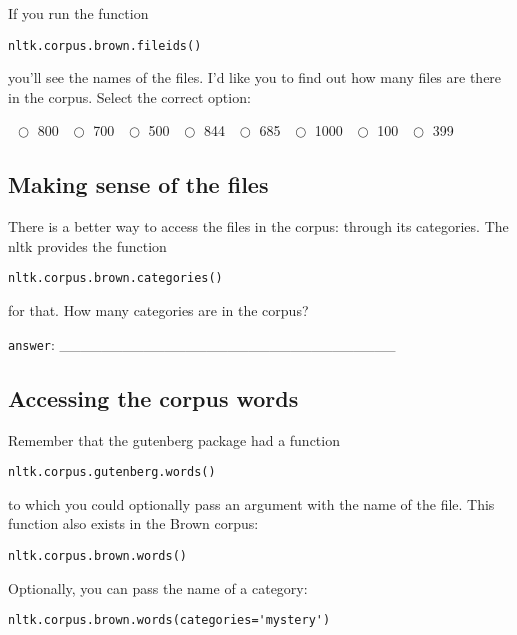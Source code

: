 \documentclass[a4paper,11pt]{scrartcl}
\begin{document}
If you run the function

\begin{verbatim}
nltk.corpus.brown.fileids()
\end{verbatim}

you'll see the names of the files. I'd like you to find out how many files
are there in the corpus. Select the correct option:

$~~\bigcirc$ 800
$~~\bigcirc$ 700
$~~\bigcirc$ 500
$~~\bigcirc$ 844
$~~\bigcirc$ 685
$~~\bigcirc$ 1000
$~~\bigcirc$ 100
$~~\bigcirc$ 399


\subsection{Making sense of the files}

There is a better way to access the files in the corpus: through its
categories. The nltk provides the function

\begin{verbatim}
nltk.corpus.brown.categories()
\end{verbatim}

for that. How many categories are in the corpus?

\verb|answer|: \_\_\_\_\_\_\_\_\_\_\_\_\_\_\_\_\_\_\_\_\_\_\_\_\_\_\_\_\_\_\_\_


\subsection{Accessing the corpus words}

Remember that the gutenberg package had a function

\begin{verbatim}
nltk.corpus.gutenberg.words()
\end{verbatim}
to which you could optionally pass an argument with the name of the file. This function also exists in the Brown corpus:

\begin{verbatim}
nltk.corpus.brown.words()
\end{verbatim}
Optionally, you can pass the name of a category:

\begin{verbatim}
nltk.corpus.brown.words(categories='mystery')
\end{verbatim}
\end{document}
